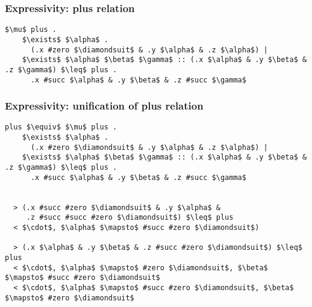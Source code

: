 \documentclass{beamer}
\begin{document}
\begin{frame}[fragile]
  \frametitle{Expressivity: plus relation}

  \begin{lstlisting}[]
  $\mu$ plus .
    $\exists$ $\alpha$ . 
      (.x #zero $\diamondsuit$ & .y $\alpha$ & .z $\alpha$) |
    $\exists$ $\alpha$ $\beta$ $\gamma$ :: (.x $\alpha$ & .y $\beta$ & .z $\gamma$) $\leq$ plus . 
      .x #succ $\alpha$ & .y $\beta$ & .z #succ $\gamma$
  \end{lstlisting}
\end{frame}

\begin{frame}[fragile]
  \frametitle{Expressivity: unification of plus relation}

  \begin{lstlisting}[]
  plus $\equiv$ $\mu$ plus .
    $\exists$ $\alpha$ . 
      (.x #zero $\diamondsuit$ & .y $\alpha$ & .z $\alpha$) |
    $\exists$ $\alpha$ $\beta$ $\gamma$ :: (.x $\alpha$ & .y $\beta$ & .z $\gamma$) $\leq$ plus . 
      .x #succ $\alpha$ & .y $\beta$ & .z #succ $\gamma$


  > (.x #succ #zero $\diamondsuit$ & .y $\alpha$ &
     .z #succ #succ #zero $\diamondsuit$) $\leq$ plus
  < $\cdot$, $\alpha$ $\mapsto$ #succ #zero $\diamondsuit$)

  > (.x $\alpha$ & .y $\beta$ & .z #succ #zero $\diamondsuit$) $\leq$ plus
  < $\cdot$, $\alpha$ $\mapsto$ #zero $\diamondsuit$, $\beta$ $\mapsto$ #succ #zero $\diamondsuit$
  < $\cdot$, $\alpha$ $\mapsto$ #succ #zero $\diamondsuit$, $\beta$ $\mapsto$ #zero $\diamondsuit$
  \end{lstlisting}


\end{frame}
\end{document}
